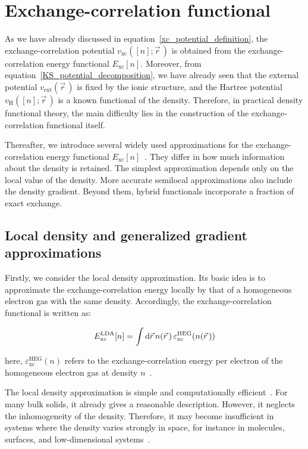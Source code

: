 \newpage
\section{Exchange-correlation functional}
\label{sec:exchange_correlation_functional}

As we have already discussed in equation~\eqref{xc_potential_definition},
the exchange-correlation potential $v_\mathrm{xc}([n];\vec{r}\,)$ is obtained from the exchange-correlation energy functional $E_\mathrm{xc}[n]$.
Moreover, from equation~\eqref{KS_potential_decomposition},
we have already seen that the external potential $v_\mathrm{ext}(\vec{r}\,)$ is fixed by the ionic structure,
and the Hartree potential $v_\mathrm{H}([n];\vec{r}\,)$ is a known functional of the density.
Therefore, in practical density functional theory,
the main difficulty lies in the construction of the exchange-correlation functional itself.

Thereafter, we introduce several widely used approximations for the exchange-correlation energy functional $E_\mathrm{xc}[n]$~\cite{martin2020electronic}.
They differ in how much information about the density is retained.
The simplest approximation depends only on the local value of the density.
More accurate semilocal approximations also include the density gradient.
Beyond them, hybrid functionals incorporate a fraction of exact exchange.

\subsection{Local density and generalized gradient approximations}

Firstly, we consider the local density approximation.
Its basic idea is to approximate the exchange-correlation energy locally by that of a homogeneous electron gas with the same density.
Accordingly, the exchange-correlation functional is written as:

\begin{equation}
    E_\mathrm{xc}^\mathrm{LDA}[n]
    = \int\mathrm{d}{\vec{r}}\,n(\vec{r}\,)\,\varepsilon_\mathrm{xc}^\mathrm{HEG}(n(\vec{r}\,))
\label{LDA_exchange_correlation_functional}
\end{equation}

here, $\varepsilon_\mathrm{xc}^\mathrm{HEG}(n)$ refers to the exchange-correlation energy per electron of the homogeneous electron gas at density $n$~\cite{dirac1930note,perdew1992accurate}.

The local density approximation is simple and computationally efficient~\cite{jones2015density,stampfl1999density}.
For many bulk solids, it already gives a reasonable description.
However, it neglects the inhomogeneity of the density.
Therefore, it may become insufficient in systems where the density varies strongly in space,
for instance in molecules, surfaces, and low-dimensional systems~\cite{martin2020electronic,li2003insights}.

